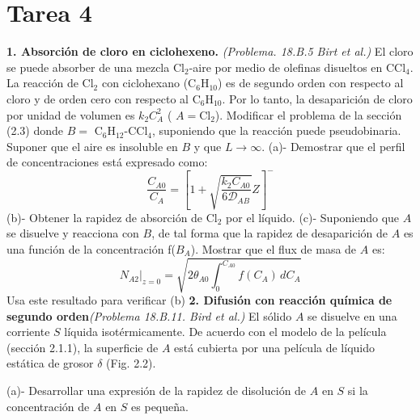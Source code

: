 \section*{Tarea 4}

\textbf{1. Absorción de cloro en ciclohexeno.} \textit{(Problema. 18.B.5 Birt et al.)}
\flushleft
El cloro se puede absorber de una mezcla Cl$_2$-aire por medio de olefinas disueltos en CCl$_4$. La reacción de Cl$_2$ con ciclohexano (C$_{6}$H$_{10}$) es de segundo orden con respecto al cloro y de orden cero con respecto al C$_{6}$H$_{10}$. Por lo tanto, la desaparición de cloro por unidad de volumen es $k_2 C_A^2$ ( $A = \text{Cl}_2$).
\flushleft
Modificar el problema de la sección (2.3) donde $B =$ C$_{6}$H$_{12}$-CCl$_4$, suponiendo que la reacción puede pseudobinaria. Suponer que el aire es insoluble en $B$ y que $L \to \infty$.
\flushleft
(a)- Demostrar que el perfil de concentraciones está expresado como:
 \[ 
 \frac{C_{A0}}{C_{A}} = \left[1 + \sqrt{\frac{k_2 C_{A0}}{6\mathscr{D}_{AB}}} Z \right]^{-}
    \]
(b)- Obtener la rapidez de absorción de Cl$_2$ por el líquido.
\flushleft
(c)- Suponiendo que $A$ se disuelve y reacciona con $B$, de tal forma que la rapidez de desaparición de $A$ es una función de la concentración f($B_A$). Mostrar que el flux de masa de $A$ es:
\[
N_{A2} \bigg|_{z=0} = \sqrt{2 \theta_{A0} \int_{0}^{C_{A0}} f(C_A) \, dC_A}
\]
Usa este resultado para verificar (b)
\flushleft
\textbf{2.  Difusión con reacción química de segundo orden}\textit{(Problema 18.B.11. Bird et al.)}
\flushleft
El sólido $A$ se disuelve en una corriente $S$ líquida isotérmicamente. De acuerdo con el modelo de la película (sección 2.1.1), la superficie de $A$ está cubierta por una película de líquido estática de grosor $\delta$ (Fig. 2.2).

(a)- Desarrollar una expresión de la rapidez de disolución de $A$ en $S$ si la concentración de $A$ en $S$ es pequeña.

